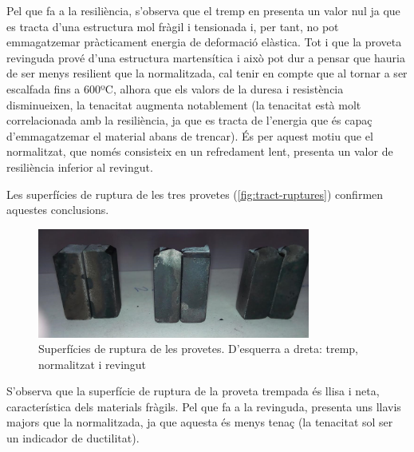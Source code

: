 \documentclass[a4paper]{report}
\begin{document}
Pel que fa a la resiliència, s’observa que el tremp en presenta un valor nul ja que es tracta d’una estructura mol fràgil i tensionada i, per tant, no pot emmagatzemar pràcticament energia de deformació elàstica. Tot i que la proveta revinguda prové d’una estructura martensítica i això pot dur a pensar que hauria de ser menys resilient que la normalitzada, cal tenir en compte que al tornar a ser escalfada fins a 600ºC, alhora que els valors de la duresa i resistència disminueixen, la tenacitat augmenta notablement (la tenacitat està molt correlacionada amb la resiliència, ja que es tracta de l’energia que és capaç d’emmagatzemar el material abans de trencar). És per aquest motiu que el normalitzat, que només consisteix en un refredament lent, presenta un valor de resiliència inferior al revingut.

Les superfícies de ruptura de les tres provetes (\autoref{fig:tract-ruptures}) confirmen aquestes conclusions.

\begin{figure}[H]
	\centering
	\includegraphics[width=0.8\textwidth]{images/tractaments/ruptures}
	\caption{Superfícies de ruptura de les provetes. D'esquerra a dreta: tremp, normalitzat i revingut}
	\label{fig:tract-ruptures}
\end{figure}

S’observa que la superfície de ruptura de la proveta trempada és llisa i neta, característica dels materials fràgils. Pel que fa a la revinguda, presenta uns llavis majors que la normalitzada, ja que aquesta és menys tenaç (la tenacitat sol ser un indicador de ductilitat).
\end{document}
